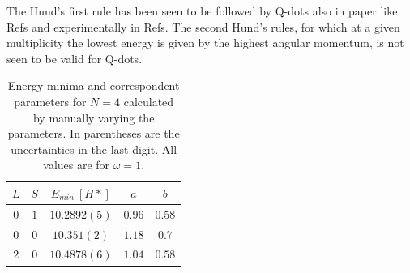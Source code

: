 The Hund's first rule has been seen to be followed by Q-dots also in paper like Refs\cite{Pederiva2000,Harju1999} and experimentally in Refs\cite{Kouwenhoven1997,Tarucha1996}.
The second Hund's rules, for which at a given multiplicity the lowest energy is given by the highest angular momentum, is not seen to be valid for Q-dots.

\begin{table}[H]
  \centering
  \begin{tabular}{c|c|c|c|c}
    \toprule
    $L$ & $S$ & $E_{min}\>[H*]$ & $a$ & $b$ \\
    \hline
    $0$ & $1$ & $10.2892(5)$ & $0.96$ & $0.58$ \\
    $0$ & $0$ & $10.351(2)$ & $1.18$ & $0.7$ \\
    $2$ & $0$ & $10.4878(6)$ & $1.04$ & $0.58$ \\
    \bottomrule
  \end{tabular}
  \caption[Energy minima and correspondent parameters for $N=4$ calculated by manually varying the parameters.]{Energy minima and correspondent parameters for $N=4$ calculated by manually varying the parameters. In parentheses are the uncertainties in the last digit. All values are for $\omega=1$.}
  \label{VarPlotMinima4}
\end{table}

